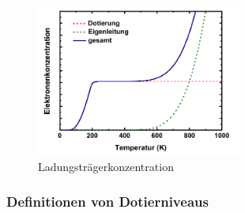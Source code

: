		\begin{figure}[h!]
			\centering
			\includegraphics[width=0.6\textwidth]{Kapitel/Kap04/ladungstraegerKonz.png}
			\caption{Ladungsträgerkonzentration}
			\label{04_ladKonz}
		\end{figure}
	
		
	\subsubsection{Definitionen von Dotierniveaus}



